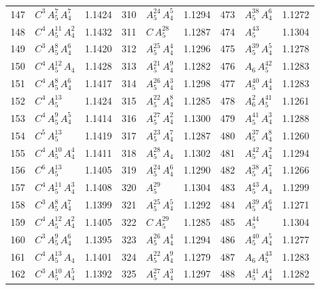 \begin{longtable}{@{}rlr@{\quad}rlr@{\quad}rlr@{}}
147 & $C^{3}$\,$A_{5}^{7}$\,$A_{4}^{7}$ & 1.1424 & 310 & $A_{5}^{24}$\,$A_{4}^{5}$ & 1.1294 & 473 & $A_{5}^{38}$\,$A_{4}^{6}$ & 1.1272 \\
148 & $C^{4}$\,$A_{5}^{11}$\,$A_{4}^{2}$ & 1.1432 & 311 & $C$\,$A_{5}^{28}$ & 1.1287 & 474 & $A_{5}^{43}$ & 1.1304 \\
149 & $C^{3}$\,$A_{5}^{8}$\,$A_{4}^{6}$ & 1.1420 & 312 & $A_{5}^{25}$\,$A_{4}^{4}$ & 1.1296 & 475 & $A_{5}^{39}$\,$A_{4}^{5}$ & 1.1278 \\
150 & $C^{4}$\,$A_{5}^{12}$\,$A_{4}$ & 1.1428 & 313 & $A_{5}^{21}$\,$A_{4}^{9}$ & 1.1282 & 476 & $A_{6}$\,$A_{5}^{42}$ & 1.1283 \\
151 & $C^{4}$\,$A_{5}^{8}$\,$A_{4}^{6}$ & 1.1417 & 314 & $A_{5}^{26}$\,$A_{4}^{3}$ & 1.1298 & 477 & $A_{5}^{40}$\,$A_{4}^{4}$ & 1.1283 \\
152 & $C^{4}$\,$A_{5}^{13}$ & 1.1424 & 315 & $A_{5}^{22}$\,$A_{4}^{8}$ & 1.1285 & 478 & $A_{6}^{2}$\,$A_{5}^{41}$ & 1.1261 \\
153 & $C^{4}$\,$A_{5}^{9}$\,$A_{4}^{5}$ & 1.1414 & 316 & $A_{5}^{27}$\,$A_{4}^{2}$ & 1.1300 & 479 & $A_{5}^{41}$\,$A_{4}^{3}$ & 1.1288 \\
154 & $C^{5}$\,$A_{5}^{13}$ & 1.1419 & 317 & $A_{5}^{23}$\,$A_{4}^{7}$ & 1.1287 & 480 & $A_{5}^{37}$\,$A_{4}^{8}$ & 1.1260 \\
155 & $C^{4}$\,$A_{5}^{10}$\,$A_{4}^{4}$ & 1.1411 & 318 & $A_{5}^{28}$\,$A_{4}$ & 1.1302 & 481 & $A_{5}^{42}$\,$A_{4}^{2}$ & 1.1294 \\
156 & $C^{6}$\,$A_{5}^{13}$ & 1.1405 & 319 & $A_{5}^{24}$\,$A_{4}^{6}$ & 1.1290 & 482 & $A_{5}^{38}$\,$A_{4}^{7}$ & 1.1266 \\
157 & $C^{4}$\,$A_{5}^{11}$\,$A_{4}^{3}$ & 1.1408 & 320 & $A_{5}^{29}$ & 1.1304 & 483 & $A_{5}^{43}$\,$A_{4}$ & 1.1299 \\
158 & $C^{3}$\,$A_{5}^{8}$\,$A_{4}^{7}$ & 1.1399 & 321 & $A_{5}^{25}$\,$A_{4}^{5}$ & 1.1292 & 484 & $A_{5}^{39}$\,$A_{4}^{6}$ & 1.1271 \\
159 & $C^{4}$\,$A_{5}^{12}$\,$A_{4}^{2}$ & 1.1405 & 322 & $C$\,$A_{5}^{29}$ & 1.1285 & 485 & $A_{5}^{44}$ & 1.1304 \\
160 & $C^{3}$\,$A_{5}^{9}$\,$A_{4}^{6}$ & 1.1395 & 323 & $A_{5}^{26}$\,$A_{4}^{4}$ & 1.1294 & 486 & $A_{5}^{40}$\,$A_{4}^{5}$ & 1.1277 \\
161 & $C^{4}$\,$A_{5}^{13}$\,$A_{4}$ & 1.1401 & 324 & $A_{5}^{22}$\,$A_{4}^{9}$ & 1.1279 & 487 & $A_{6}$\,$A_{5}^{43}$ & 1.1283 \\
162 & $C^{3}$\,$A_{5}^{10}$\,$A_{4}^{5}$ & 1.1392 & 325 & $A_{5}^{27}$\,$A_{4}^{3}$ & 1.1297 & 488 & $A_{5}^{41}$\,$A_{4}^{4}$ & 1.1282 \\

\end{longtable}
